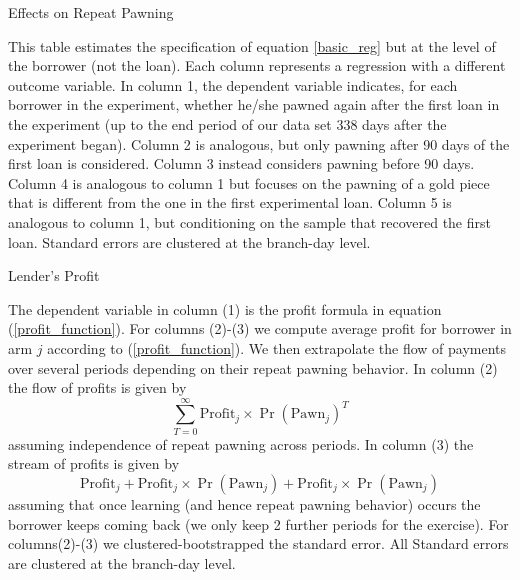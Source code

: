 \begin{appendix}
\begin{table}[!h]
\caption{Effects on Repeat Pawning}
\label{repeat_loans}
\begin{center}
\footnotesize{}
\end{center}
 \footnotesize{This table estimates the specification of equation \ref{basic_reg} but at the level of the borrower (not the loan). Each column represents a regression with a different outcome variable. In column 1, the dependent variable indicates, for each borrower in the experiment, whether he/she pawned again after the first loan in the experiment (up to the end period of our data set 338 days after the experiment began). Column 2 is analogous, but only pawning after 90 days of the first loan is considered. Column 3 instead considers pawning before 90 days. Column 4 is analogous to column 1 but focuses on the pawning of a gold piece that is different from the one in the first experimental loan. Column 5 is analogous to column 1, but conditioning on the sample that recovered the first loan. 
Standard errors are clustered at the branch-day level.}
\end{table}



\begin{table}[!h]
\caption{Lender's Profit}
\label{lenders_profit}
\begin{center}
 \footnotesize{}
\end{center}
 \footnotesize{ The dependent variable in column (1) is the profit formula in equation (\ref{profit_function}). For columns (2)-(3) we compute average profit for borrower in arm $j$ according to (\ref{profit_function}). We then extrapolate the flow of payments over several periods depending on their repeat pawning behavior. In column (2) the flow of profits is given by
 \[\sum_{T=0}^{\infty}\text{Profit}_j\times\Pr(\text{Pawn}_j)^T\]
 assuming independence of repeat pawning across periods. In column (3) the stream of profits is given by
 \[\text{Profit}_j + \text{Profit}_j\times \Pr(\text{Pawn}_j) +\text{Profit}_j\times\Pr(\text{Pawn}_j) \]
 assuming that once learning (and hence repeat pawning behavior) occurs the borrower keeps coming back (we only keep 2 further periods for the exercise).
 For columns(2)-(3) we clustered-bootstrapped the standard error. All Standard errors are clustered at the branch-day level.}
\end{table}


\end{appendix}
